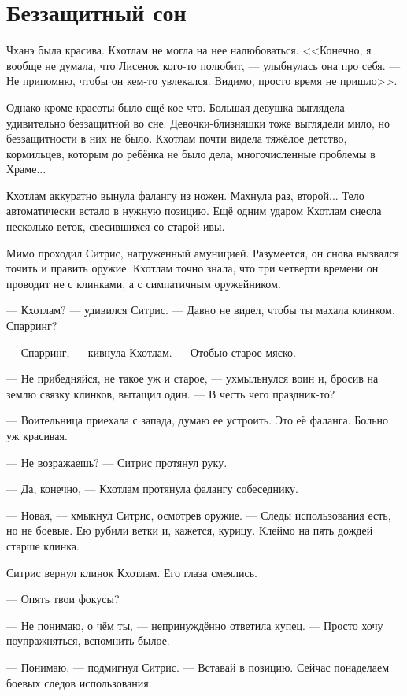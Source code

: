 \section{Беззащитный сон}

Чханэ была красива.
Кхотлам не могла на нее налюбоваться.
<<Конечно, я вообще не думала, что Лисенок кого-то полюбит, --- улыбнулась она про себя.
--- Не припомню, чтобы он кем-то увлекался.
Видимо, просто время не пришло>>.

Однако кроме красоты было ещё кое-что.
Большая девушка выглядела удивительно беззащитной во сне.
Девочки-близняшки тоже выглядели мило, но беззащитности в них не было.
Кхотлам почти видела тяжёлое детство, кормильцев, которым до ребёнка не было дела, многочисленные проблемы в Храме...

\asterism

Кхотлам аккуратно вынула фалангу из ножен.
Махнула раз, второй...
Тело автоматически встало в нужную позицию.
Ещё одним ударом Кхотлам снесла несколько веток, свесившихся со старой ивы.

Мимо проходил Ситрис, нагруженный амуницией.
Разумеется, он снова вызвался точить и править оружие.
Кхотлам точно знала, что три четверти времени он проводит не с клинками, а с симпатичным оружейником.

--- Кхотлам? --- удивился Ситрис.
--- Давно не видел, чтобы ты махала клинком.
Спарринг?

--- Спарринг, — кивнула Кхотлам.
--- Отобью старое мяско.

--- Не прибедняйся, не такое уж и старое, --- ухмыльнулся воин и, бросив на землю связку клинков, вытащил один.
--- В честь чего праздник-то?

--- Воительница приехала с запада, думаю ее устроить.
Это её фаланга.
Больно уж красивая.

--- Не возражаешь? --- Ситрис протянул руку.

--- Да, конечно, --- Кхотлам протянула фалангу собеседнику.

--- Новая, --- хмыкнул Ситрис, осмотрев оружие.
--- Следы использования есть, но не боевые.
Ею рубили ветки и, кажется, курицу.
Клеймо на пять дождей старше клинка.

Ситрис вернул клинок Кхотлам.
Его глаза смеялись.

--- Опять твои фокусы?

--- Не понимаю, о чём ты, --- непринуждённо ответила купец.
--- Просто хочу поупражняться, вспомнить былое.

--- Понимаю, --- подмигнул Ситрис.
--- Вставай в позицию.
Сейчас понаделаем боевых следов использования.

